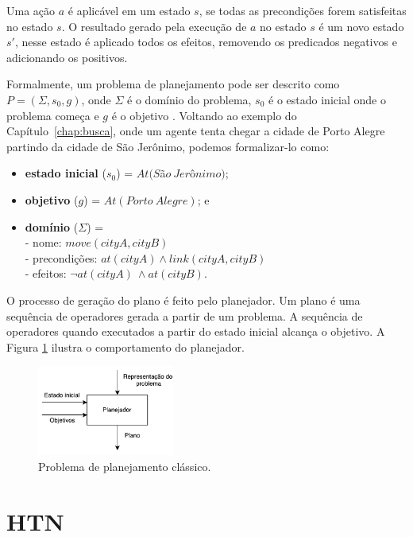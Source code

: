 Uma ação $a$ é aplicável em um estado $s$, se todas as precondições forem satisfeitas no estado $s$. O resultado gerado pela execução de $a$ no estado $s$ é um novo estado $s'$, nesse estado é aplicado todos os efeitos, removendo os predicados negativos e adicionando os positivos.

Formalmente, um problema de planejamento pode ser descrito como $P = (\Sigma, s_{0}, g)$, onde $\Sigma$ é o domínio do problema, $s_{0}$ é o estado inicial onde o problema começa e $g$ é o objetivo \cite{ghallab2004automated}. Voltando ao exemplo do Capítulo~\ref{chap:busca}, onde um agente tenta chegar a cidade de Porto Alegre partindo da cidade de São Jerônimo, podemos formalizar-lo como:

\begin{itemize}
	\item \textbf{estado inicial} ($s_{0}$) = $At(S$\~a$o~Jer$\^o$nimo)$;
	\item \textbf{objetivo} ($g$) = $At(Porto~Alegre)$; e
	\item \textbf{domínio} ($\Sigma$) = \\
	-	nome: $move(cityA, cityB)$\\
	-	precondições: $at(cityA) \wedge link(cityA, cityB)$\\
	-	efeitos: $\neg at(cityA)~ \wedge at(cityB)$.
\end{itemize}

O processo de geração do plano é feito pelo planejador. Um plano é uma sequência de operadores gerada a partir de um problema. A sequência de operadores quando executados a partir do estado inicial alcança o objetivo. A Figura \ref{fig:planmodelo} ilustra o comportamento do planejador.

\begin{figure}[ht]
	\centering
	\includegraphics[width=0.4\textwidth]{fig/modelo.pdf}
	\caption{Problema de planejamento clássico.}
	\label{fig:planmodelo}
\end{figure} 


\section{HTN} 



